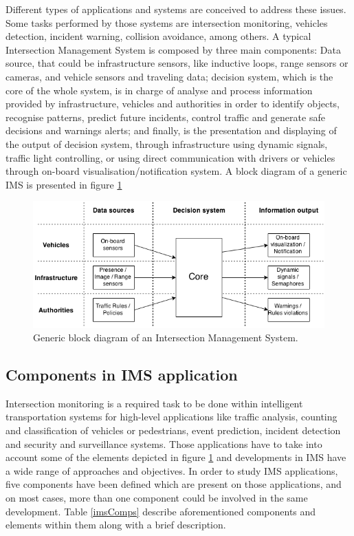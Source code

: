 \documentclass[conference]{IEEEtran}
\begin{document}
Different types of applications and systems are conceived to address these issues. Some tasks performed by those systems are intersection monitoring, vehicles detection, incident warning, collision avoidance, among others. A typical Intersection Management System is composed by three main components: Data source, that could be infrastructure sensors, like inductive loops, range sensors or cameras, and vehicle sensors and traveling data; decision system, which is the core of the whole system, is in charge of analyse and process information provided by infrastructure, vehicles and authorities in order to identify objects, recognise patterns, predict future incidents, control traffic and generate safe decisions and warnings alerts; and finally, is the presentation and displaying of the output of decision system, through infrastructure using dynamic signals, traffic light controlling, or using direct communication with drivers or vehicles through on-board visualisation/notification system. A block diagram of a generic IMS is presented in figure \ref{arch}

\begin{figure}[ht!]
\centering
\includegraphics[scale=0.38]{../fig/2/genericIMS.png}
\caption{Generic block diagram of an Intersection Management System.}
\label{arch}
\end{figure}

\subsection{Components in IMS application}

Intersection monitoring is a required task to be done within intelligent transportation systems for high-level applications like traffic analysis, counting and classification of vehicles or pedestrians, event prediction, incident detection and security and surveillance systems. Those applications have to take into account some of the elements depicted in figure \ref{arch} and developments in IMS have a wide range of approaches and objectives. In order to study IMS applications, five components have been defined which are present on those applications, and on most cases, more than one component could be involved in the same development. Table \ref{imsComps} describe aforementioned components and elements within them along with a brief description.
\end{document}
